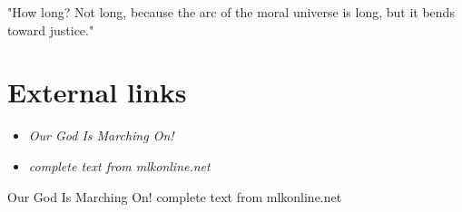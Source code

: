 "How long? Not long, because the arc of the moral universe is long, but
it bends toward justice."

\section{External links}\label{external-links}

\begin{itemize}
\item
  \emph{Our God Is Marching On!}
\item
  \emph{complete text from mlkonline.net}
\end{itemize}

Our God Is Marching On! complete text from mlkonline.net
